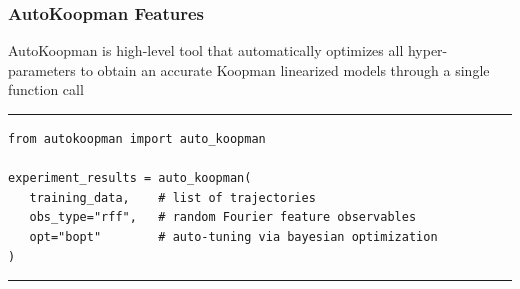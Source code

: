\documentclass[shortpres,aspectratio=43]{beamer}
\begin{document}
\begin{frame}[fragile]
\frametitle{AutoKoopman Features}

AutoKoopman is high-level tool that automatically optimizes all hyper-parameters to obtain an accurate Koopman linearized models through a single function call
\rule{\textwidth}{1pt}
\scriptsize
\begin{verbatim}
from autokoopman import auto_koopman

experiment_results = auto_koopman(
   training_data,    # list of trajectories
   obs_type="rff",   # random Fourier feature observables
   opt="bopt"        # auto-tuning via bayesian optimization
)      
\end{verbatim}
\rule{\textwidth}{1pt}

\end{frame}
\end{document}
